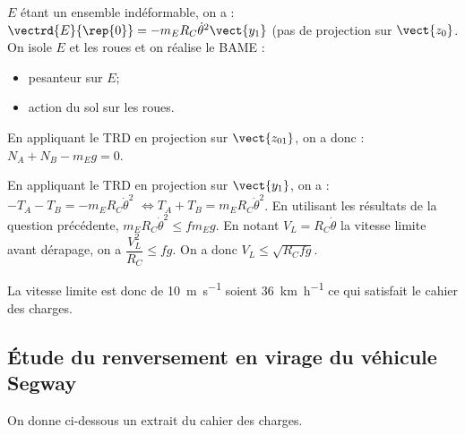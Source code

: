 \begin{multicols}{2}
\ifnormal
{}%
\else
\fi
\ifprof
\begin{corrige}
$E$ étant un ensemble indéformable, on a : $\vectrd{E}{\rep{0}}=-m_E R_C\dot{\theta}^2\vect{y_1}$ (pas de projection sur $\vect{z_0}$. 
On isole $E$ et les roues  et on réalise le BAME : 
\begin{itemize}
\item pesanteur sur $E$;
\item action du sol sur les roues.
\end{itemize}

En appliquant le TRD en projection sur $\vect{z_{01}}$, on a donc :
$N_A+N_B-m_E g = 0$. 


\end{corrige}
\else
\fi

\ifnormal
{}
\else
\fi

\ifprof

\begin{corrige}
En appliquant le TRD en projection sur $\vect{y_{1}}$, on a : $-T_A-T_B = -m_E R_C\dot{\theta}^2$ $\Leftrightarrow T_A+T_B = m_E R_C\dot{\theta}^2$. En utilisant les résultats de la question précédente, $m_E R_C\dot{\theta}^2 \leq fm_E g $. En notant $V_L=R_C\dot{\theta}$ la vitesse limite avant dérapage, on a $ \dfrac{V_L^2}{R_C} \leq f  g $.
On a donc $V_L \leq \sqrt{R_Cfg}$.
\end{corrige}
\else
\fi

\ifnormal
{}
\else
\fi
\ifprof
\begin{corrige}
La vitesse limite est donc de \SI{10}{m.s^{-1}} soient \SI{36}{km.h^{-1}} ce qui satisfait le cahier des charges. 
\end{corrige}
\else
\fi

\iftdifficile
{}

\else
\fi


\subsection*{Étude du renversement en virage du véhicule Segway}
\ifprof
\else
On donne ci-dessous un extrait du cahier des charges.



\end{multicols}
